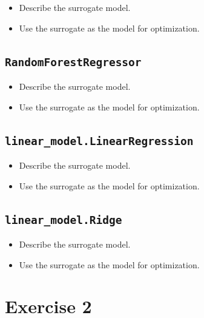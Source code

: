 \documentclass[
  letterpaper,
  DIV=11,
  numbers=noendperiod]{scrreprt}
\providecommand{\tightlist}{%
  \setlength{\itemsep}{0pt}\setlength{\parskip}{0pt}}\usepackage{longtable,booktabs,array}
\begin{document}
\begin{itemize}
\tightlist
\item
  Describe the surrogate model.
\item
  Use the surrogate as the model for optimization.
\end{itemize}

\subsection{\texorpdfstring{\texttt{RandomForestRegressor}}{RandomForestRegressor}}\label{randomforestregressor}

\begin{itemize}
\tightlist
\item
  Describe the surrogate model.
\item
  Use the surrogate as the model for optimization.
\end{itemize}

\subsection{\texorpdfstring{\texttt{linear\_model.LinearRegression}}{linear\_model.LinearRegression}}\label{linear_model.linearregression}

\begin{itemize}
\tightlist
\item
  Describe the surrogate model.
\item
  Use the surrogate as the model for optimization.
\end{itemize}

\subsection{\texorpdfstring{\texttt{linear\_model.Ridge}}{linear\_model.Ridge}}\label{linear_model.ridge}

\begin{itemize}
\tightlist
\item
  Describe the surrogate model.
\item
  Use the surrogate as the model for optimization.
\end{itemize}

\section{Exercise 2}\label{exercise-2}
\end{document}

